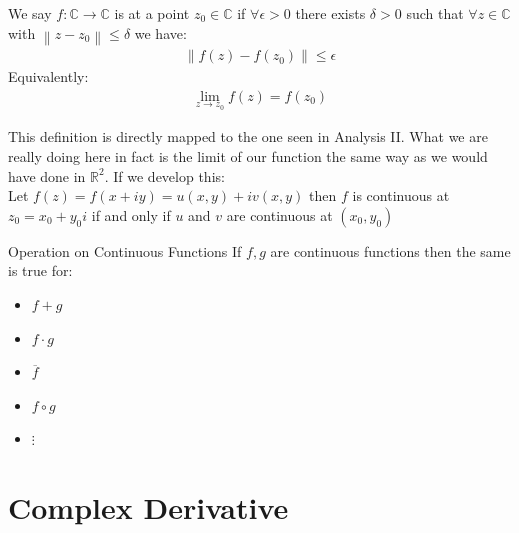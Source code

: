 \begin{definition}
We say $f: \mathbb{C} \to \mathbb{C}$ is  at a point $z_0 \in \mathbb{C}$ if $\forall \epsilon > 0 $ there exists $\delta > 0 $ such that $\forall z \in \mathbb{C}$ with $\left\|z - z_0\right\| \leq \delta$ we have:
\begin{align*} \left\|f\left(z\right) - f\left(z_0\right)\right\| \leq \epsilon \end{align*}
Equivalently:
\begin{align*} \lim_{z \to z_0} f\left(z\right) =  f\left(z_0\right) \end{align*}
\end{definition} 
\begin{framedremark}
This definition is directly mapped to the one seen in Analysis II. What we are really doing here in fact is the limit of our function the same way as we would have done in $ \mathbb{R}^2$. If we develop this:\\
    Let $f\left(z\right) = f\left(x + iy\right) =  u\left(x, y\right) + iv\left(x, y\right)$ then $f$ is continuous at $z_0 = x_0 + y_0i$ if and only if $u$ and $v$ are continuous at $\left(x_0, y_0\right)$ 
\end{framedremark}
\begin{parag}{Operation on Continuous Functions}
    If $f, g$ are continuous functions then the same is true for:
	\begin{itemize}
		\item $f+ g$
		\item $f \cdot  g$
		\item $\overline{f}$
		\item $f \circ g$
		\item $\vdots$
	\end{itemize}
	
\end{parag}


\section{Complex Derivative}

